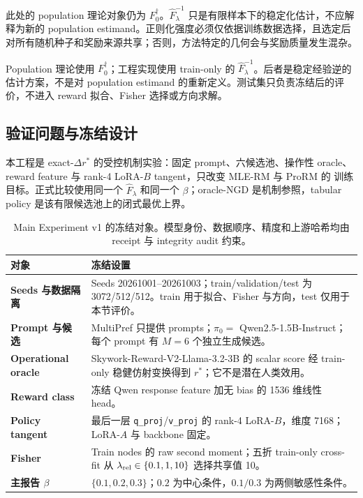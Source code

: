 \documentclass[UTF8,11pt,a4paper,fontset=none]{ctexart}
\begin{document}
此处的 population 理论对象仍为 $F_0^\dagger$。$\widehat F_{\lambda}^{-1}$ 只是有限样本下的稳定化估计，不应解释为新的 population estimand。正则化强度必须仅依据训练数据选择，且选定后对所有随机种子和奖励来源共享；否则，方法特定的几何会与奖励质量发生混杂。

\begin{warnbox}[理论与有限样本实现的边界]
Population 理论使用 $F_0^\dagger$；工程实现使用 train-only 的
$\widehat F_\lambda^{-1}$。后者是稳定经验逆的估计方案，不是对 population
estimand 的重新定义。测试集只负责冻结后的评价，不进入 reward 拟合、Fisher
选择或方向求解。
\end{warnbox}

\subsection{验证问题与冻结设计}

本工程是 exact-$\Delta r^*$ 的受控机制实验：固定 prompt、六候选池、操作性
oracle、reward feature 与 rank-4 LoRA-$B$ tangent，只改变 MLE-RM 与 ProRM 的
训练目标。正式比较使用同一个 $\widehat F_\lambda$ 和同一个 $\beta$；oracle-NGD
是机制参照，tabular policy 是该有限候选池上的闭式最优上界。

\begin{table}[ht]
\centering
\small
\setlength{\tabcolsep}{4.2pt}
\begin{tabularx}{\textwidth}{>{\raggedright\arraybackslash\bfseries\color{navy}}p{3.35cm} X}
\toprule
\rowcolor{lightblue}
对象 & 冻结设置\\
\midrule
Seeds 与数据隔离 & Seeds 20261001--20261003；train/validation/test 为 3072/512/512。train 用于拟合、Fisher 与方向，test 仅用于本节评价。\\
Prompt 与候选 & MultiPref 只提供 prompts；$\pi_0=$ Qwen2.5-1.5B-Instruct；每个 prompt 有 $M=6$ 个独立生成候选。\\
Operational oracle & Skywork-Reward-V2-Llama-3.2-3B 的 scalar score 经 train-only 稳健仿射变换得到 $r^*$；它不是潜在人类效用。\\
Reward class & 冻结 Qwen response feature 加无 bias 的 1536 维线性 head。\\
Policy tangent & 最后一层 \texttt{q\_proj}/\texttt{v\_proj} 的 rank-4 LoRA-$B$，维度 7168；LoRA-$A$ 与 backbone 固定。\\
Fisher & Train nodes 的 raw second moment；五折 train-only cross-fit 从 $\lambda_{\rm rel}\in\{0.1,1,10\}$ 选择共享值 10。\\
主报告 $\beta$ & $\{0.1,0.2,0.3\}$；$0.2$ 为中心条件，$0.1/0.3$ 为两侧敏感性条件。\\
\bottomrule
\end{tabularx}
\caption{Main Experiment v1 的冻结对象。模型身份、数据顺序、精度和上游哈希均由 receipt 与 integrity audit 约束。}
\label{tab:engineering-config}
\end{table}
\end{document}
